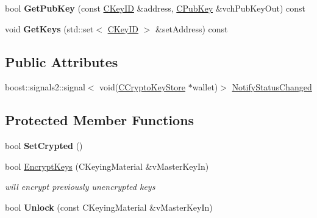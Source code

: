 \begin{DoxyCompactItemize}
\item 
\mbox{\label{class_c_crypto_key_store_a20b474adfe6900bb36cd4fd6f9c31380}} 
bool {\bfseries Get\+Pub\+Key} (const \mbox{\hyperlink{class_c_key_i_d}{C\+Key\+ID}} \&address, \mbox{\hyperlink{class_c_pub_key}{C\+Pub\+Key}} \&vch\+Pub\+Key\+Out) const
\item 
\mbox{\label{class_c_crypto_key_store_a84e2fb905745176ab784c3413520e46f}} 
void {\bfseries Get\+Keys} (std\+::set$<$ \mbox{\hyperlink{class_c_key_i_d}{C\+Key\+ID}} $>$ \&set\+Address) const
\end{DoxyCompactItemize}
\subsection*{Public Attributes}
\begin{DoxyCompactItemize}
\item 
boost\+::signals2\+::signal$<$ void(\mbox{\hyperlink{class_c_crypto_key_store}{C\+Crypto\+Key\+Store}} $\ast$wallet)$>$ \mbox{\hyperlink{class_c_crypto_key_store_aeeb1c466663df6be9be54b1833e0f888}{Notify\+Status\+Changed}}
\end{DoxyCompactItemize}
\subsection*{Protected Member Functions}
\begin{DoxyCompactItemize}
\item 
\mbox{\label{class_c_crypto_key_store_af202f587051735be5a39344d9e333720}} 
bool {\bfseries Set\+Crypted} ()
\item 
\mbox{\label{class_c_crypto_key_store_a8c0f6b63fb04193df16243c4459b7c61}} 
bool \mbox{\hyperlink{class_c_crypto_key_store_a8c0f6b63fb04193df16243c4459b7c61}{Encrypt\+Keys}} (C\+Keying\+Material \&v\+Master\+Key\+In)
\begin{DoxyCompactList}\small\item\em will encrypt previously unencrypted keys \end{DoxyCompactList}\item 
\mbox{\label{class_c_crypto_key_store_a81bd70e18aa75f566526620a74f9cd88}} 
bool {\bfseries Unlock} (const C\+Keying\+Material \&v\+Master\+Key\+In)
\end{DoxyCompactItemize}
